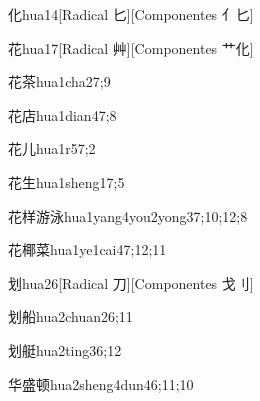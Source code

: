 \begin{verbete}{化}{hua1}{4}[Radical 匕][Componentes 亻匕]
\end{verbete}

\begin{verbete}{花}{hua1}{7}[Radical 艸][Componentes 艹化]
\end{verbete}

\begin{verbete}{花茶}{hua1cha2}{7;9}
\end{verbete}

\begin{verbete}{花店}{hua1dian4}{7;8}
\end{verbete}

\begin{verbete}{花儿}{hua1r5}{7;2}
\end{verbete}

\begin{verbete}{花生}{hua1sheng1}{7;5}
\end{verbete}

\begin{verbete}{花样游泳}{hua1yang4you2yong3}{7;10;12;8}
\end{verbete}

\begin{verbete}{花椰菜}{hua1ye1cai4}{7;12;11}
\end{verbete}

\begin{verbete}{划}{hua2}{6}[Radical 刀][Componentes 戈刂]
\end{verbete}

\begin{verbete}{划船}{hua2chuan2}{6;11}
\end{verbete}

\begin{verbete}{划艇}{hua2ting3}{6;12}
\end{verbete}

\begin{verbete}{华盛顿}{hua2sheng4dun4}{6;11;10}
\end{verbete}

